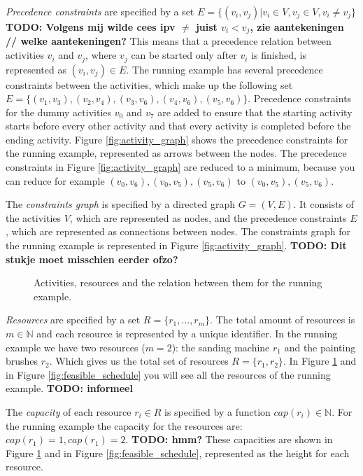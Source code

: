 \documentclass{article}
\theoremstyle{definition}
\newcommand{\TODO}[1]{{\color{red}\textbf{TODO: #1}}}
\newcommand{\capa}[1]{\ensuremath{cap(r_{#1})}} %
\begin{document}
\emph{Precedence constraints} are specified by a set $E = \{(v_i, v_j) | v_i \in V, v_j \in V, v_i \neq v_j\}$ \TODO{Volgens mij wilde cees ipv $\neq$ juist $v_i < v_j$, zie aantekeningen // welke aantekeningen?}
This means that a precedence relation between activities $v_i$ and $v_j$, where $v_j$ can be started only after $v_i$ is finished, is represented as $(v_i, v_j) \in E$.
The running example has several precedence constraints between the activities, which make up the following set $E = \{(v_1, v_3), (v_2, v_4), (v_3, v_6), (v_4, v_6), (v_5, v_6)\}$.
Precedence constraints for the dummy activities $v_0$ and $v_7$ are added to ensure that the starting activity starts before every other activity and that every activity is completed before the ending activity.
Figure \ref{fig:activity_graph} shows the precedence constraints for the running example, represented as arrows between the nodes.
The precedence constraints in Figure \ref{fig:activity_graph} are reduced to a minimum, because you can reduce for example $(v_0,v_6), (v_0, v_5), (v_5, v_6)$ to $(v_0, v_5), (v_5, v_6)$.

The \emph{constraints graph} is specified by a directed graph $G = (V, E)$.
It consists of the activities $V$, which are represented as nodes, and the precedence constraints $E$, which are represented as connections between nodes.
The constraints graph for the running example is represented in Figure \ref{fig:activity_graph}.
\TODO{Dit stukje moet misschien eerder ofzo?}

\begin{figure}[h]
	\centering
	
	\caption{Activities, resources and the relation between them for the running example.}
	\label{fig:resource_graph}
\end{figure}

\emph{Resources} are specified by a set $R = \{r_1, \ldots, r_m\}$.
The total amount of resources is $m \in \mathbb{N}$ and each resource is represented by a unique identifier. %
In the running example we have two resources ($m = 2$): the sanding machine $r_1$ and the painting brushes $r_2$.
Which gives us the total set of resources $R = \{r_1, r_2\}$.
In Figure \ref{fig:resource_graph} and in Figure \ref{fig:feasible_schedule} you will see all the resources of the running example. \TODO{informeel}

The \emph{capacity} of each resource $r_i \in R$ is specified by a function $\capa{i} \in \mathbb{N}$.
For the running example the capacity for the resources are: $\capa{1} = 1, \capa{1} = 2$. \TODO{hmm?}
These capacities are shown in Figure \ref{fig:resource_graph} and in Figure \ref{fig:feasible_schedule}, represented as the height for each resource. 
\end{document}
